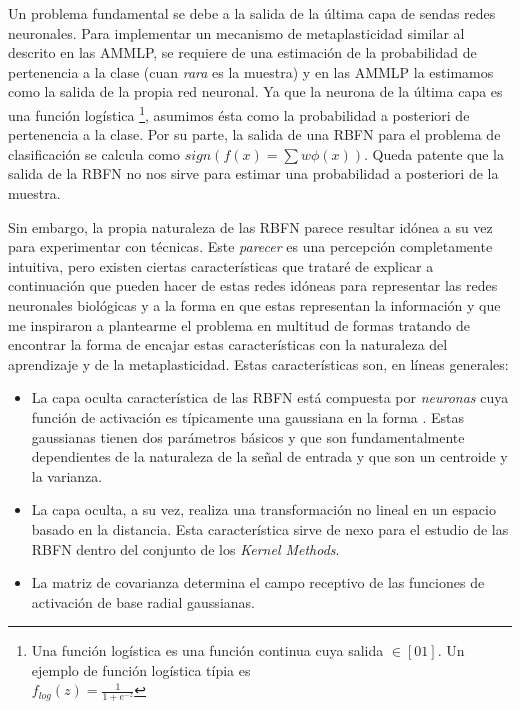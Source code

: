 \documentclass[10pt,a4paper]{report}
\begin{document}
Un problema fundamental se debe a la salida de la última capa de sendas redes neuronales. Para implementar un mecanismo de metaplasticidad similar al descrito en las AMMLP, se requiere de una estimación de la probabilidad de pertenencia a la clase (cuan \textit{rara} es la muestra) y en las AMMLP la estimamos como la salida de la propia red neuronal. Ya que la neurona de la última capa es una función logística \footnote{Una función logística es una función continua cuya salida $\in [0 1]$. Un ejemplo de función logística típia es \\ $f_{log}(z)=\frac{1}{1+e^{-z}}$}, asumimos ésta como la probabilidad a posteriori de pertenencia a la clase. Por su parte, la salida de una RBFN para el problema de clasificación se calcula como $sign(f(x)=\sum w \phi(x))$. Queda patente que la salida de la RBFN no nos sirve para estimar una probabilidad a posteriori de la muestra.

Sin embargo, la propia naturaleza de las RBFN parece resultar idónea a su vez para experimentar con técnicas. Este \textit{parecer} es una percepción completamente intuitiva, pero existen ciertas características que trataré de explicar a continuación que pueden hacer de estas redes idóneas para representar las redes neuronales biológicas y a la forma en que estas representan la información y que me inspiraron a plantearme el problema en multitud de formas tratando de encontrar la forma de encajar estas características con la naturaleza del aprendizaje y de la metaplasticidad. Estas características son, en líneas generales:

\begin{itemize}
	\item La capa oculta característica de las RBFN está compuesta por \textit{neuronas} cuya función de activación es típicamente una gaussiana en la forma . Estas gaussianas tienen dos parámetros básicos y que son fundamentalmente dependientes de la naturaleza de la señal de entrada y que son un centroide y la varianza.
	\item La capa oculta, a su vez, realiza una transformación no lineal en un espacio basado en la distancia. Esta característica sirve de nexo para el estudio de las RBFN dentro del conjunto de los \textit{Kernel Methods}.
	\item La matriz de covarianza determina el campo receptivo de las funciones de activación de base radial gaussianas.
\end{itemize}
\end{document}
